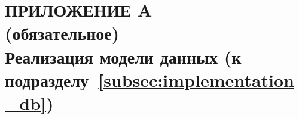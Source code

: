 \renewcommand{\thefigure}{\Asbuk{section}.\arabic{figure}}
\renewcommand{\thetable}{\Asbuk{section}.\arabic{table}}
\renewcommand{\thelstlisting}{\Asbuk{section}.\arabic{lstlisting}}

\fancyhf{} %
\fancyfoot[R]{\thepage}
\setlength{\footskip}{-2.5mm}
\setlength{\headheight}{8mm}

\thispagestyle{plain}
\section*{%
  ПРИЛОЖЕНИЕ A \\
  (обязательное) \\
  Реализация модели данных
  (к подразделу~\ref{subsec:implementation_db})
}

\setcounter{section}{1}
\setcounter{figure}{0}
\setcounter{table}{0}
\setcounter{lstlisting}{0}

\vspace{-\baselineskip}

\pagebreak